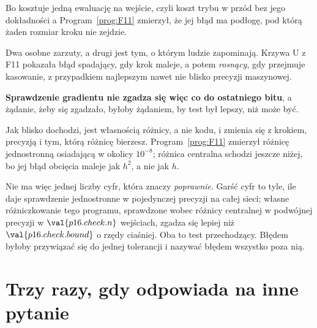 \begin{fr}
\begin{ansblock}
Bo kosztuje jedną ewaluację na wejście, czyli koszt trybu w przód bez jego
dokładności \dash{} a Program~\ref{prog:F11} zmierzył, że jej błąd ma podłogę,
pod którą żaden rozmiar kroku nie zejdzie.
\end{ansblock}

Dwa osobne zarzuty, a drugi jest tym, o którym ludzie zapominają. Krzywa U z
F11 pokazała błąd spadający, gdy krok maleje, a potem \emph{rosnący}, gdy
przejmuje kasowanie, z przypadkiem najlepszym nawet nie blisko precyzji
maszynowej.

\textbf{Sprawdzenie gradientu nie zgadza się więc co do ostatniego bitu}, a
żądanie, żeby się zgadzało, byłoby żądaniem, by test był lepszy, niż może być.

Jak blisko dochodzi, jest własnością różnicy, a nie kodu, i zmienia się z
krokiem, precyzją i tym, którą różnicę bierzesz. Program~\ref{prog:F11}
zmierzył różnicę jednostronną osiadającą w okolicy $10^{-8}$; różnica
centralna schodzi jeszcze niżej, bo jej błąd obcięcia maleje jak $h^{2}$, a
nie jak $h$.

Nie ma więc jednej liczby cyfr, która znaczy \emph{poprawnie}. Garść cyfr to
tyle, ile daje sprawdzenie jednostronne w pojedynczej precyzji na całej sieci;
własne różniczkowanie tego programu, sprawdzone wobec różnicy centralnej w
podwójnej precyzji w $\val{p16.check.n}$ wejściach, zgadza się lepiej niż
$\val{p16.check.bound}$ \dash{} o rzędy ciaśniej. Oba to test przechodzący.
Błędem byłoby przywiązać się do jednej tolerancji i nazywać błędem wszystko
poza nią.
\end{fr}

\section{Trzy razy, gdy odpowiada na inne pytanie}
\label{sec:P16-silent}

